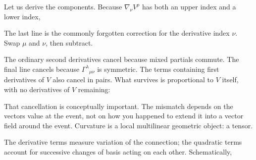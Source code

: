 \documentclass[
  11pt,
  letterpaper,
  oneside,
  openany]{scrbook}
\begin{document}
Let us derive the components. Because \(\nabla_\nu V^\rho\) has both an
upper index and a lower index,

\begin{center}
\begingroup
{}
\ifdim\wd\grmathbox>\linewidth
\resizebox{\linewidth}{!}{\usebox{\grmathbox}}
\else\usebox{\grmathbox}\fi
\endgroup
\end{center}

The last line is the commonly forgotten correction for the derivative
index \(\nu\). Swap \(\mu\) and \(\nu\), then subtract.

The ordinary second derivatives cancel because mixed partials commute.
The final line cancels because \(\Gamma^\lambda{}_{\mu\nu}\) is
symmetric. The terms containing first derivatives of \(V\) also cancel
in pairs. What survives is proportional to \(V\) itself, with no
derivatives of \(V\) remaining:

\begin{center}
\begingroup
{}
\ifdim\wd\grmathbox>\linewidth
\resizebox{\linewidth}{!}{\usebox{\grmathbox}}
\else\usebox{\grmathbox}\fi
\endgroup
\end{center}

That cancellation is conceptually important. The mismatch depends on the
vector\textquotesingle s value at the event, not on how you happened to
extend it into a vector field around the event. Curvature is a local
multilinear geometric object: a tensor.

The derivative terms measure variation of the connection; the quadratic
terms account for successive changes of basis acting on each other.
Schematically,
\end{document}

